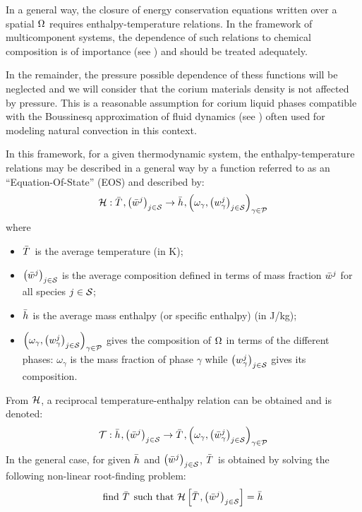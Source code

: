 In a general way, the closure of energy conservation equations written over a spatial $\domain{}$ requires enthalpy-temperature relations. In the framework of multicomponent systems, the dependence of such relations to chemical composition is of importance (see \cite{Schneider1991}) and should be treated adequately. 

In the remainder, the pressure possible dependence of thess functions will be neglected and we will consider that the corium materials density is not affected by pressure. This is a reasonable assumption for corium liquid phases compatible with the Boussinesq approximation of fluid dynamics (see \cite{Hills1991}) often used for modeling natural convection in this context.

In this framework, for a given thermodynamic system, the enthalpy-temperature relations may be described in a general way by a function referred to as an ``Equation-Of-State'' (EOS) and described by:
\begin{equation}
 \Mc{H}: \avTemperature{}, \left(\avMassFraction[j]{}\right)_{j\in \speciesSet} \rightarrow  \avMassEnthalpy{}, \left(\omega_\gamma, \left(\massFraction[j]{\gamma}\right)_{j\in \speciesSet}\right)_{\gamma \in \phaseSet} \label{eq:eos}
\end{equation}
where
\begin{itemize}
 \item $\avTemperature{}$ is the average temperature (in K);
 \item $\left(\avMassFraction[j]{}\right)_{j\in \speciesSet}$ is the average composition defined in terms of mass fraction $\avMassFraction[j]{}$ for all species $j\in \speciesSet$;
 \item $\avMassEnthalpy{}$ is the average mass enthalpy (or specific enthalpy) (in J/kg);
 \item $\left(\omega_\gamma, \left(\massFraction[j]{\gamma}\right)_{j\in \speciesSet}\right)_{\gamma \in \phaseSet}$ gives the composition of $\domain{}$ in terms of the different phases: $\omega_\gamma$ is the mass fraction of phase $\gamma$ while $\left(\massFraction[j]{\gamma}\right)_{j\in \speciesSet}$ gives its composition.
\end{itemize}

From $\Mc{H}$, a reciprocal temperature-enthalpy relation can be obtained and is denoted:
\begin{equation}
\Mc{T}: \avMassEnthalpy{}, \left(\avMassFraction[j]{}\right)_{j\in \speciesSet} \rightarrow \avTemperature{}, \left(\omega_\gamma, \left(\avMassFraction[j]{\gamma}\right)_{j\in \speciesSet}\right)_{\gamma \in \phaseSet}
\end{equation}
In the general case, for given $\avMassEnthalpy{}$ and $\left(\avMassFraction[j]{}\right)_{j\in \speciesSet}$, $\avTemperature{}$ is obtained by solving the following non-linear root-finding problem: 
\begin{equation}
 \text{find } \avTemperature{} \text{ such that }\Mc{H}\left[\avTemperature{}, \left(\avMassFraction[j]{}\right)_{j\in \speciesSet}\right] = \avMassEnthalpy{} \label{eq:t(h)}
\end{equation}

